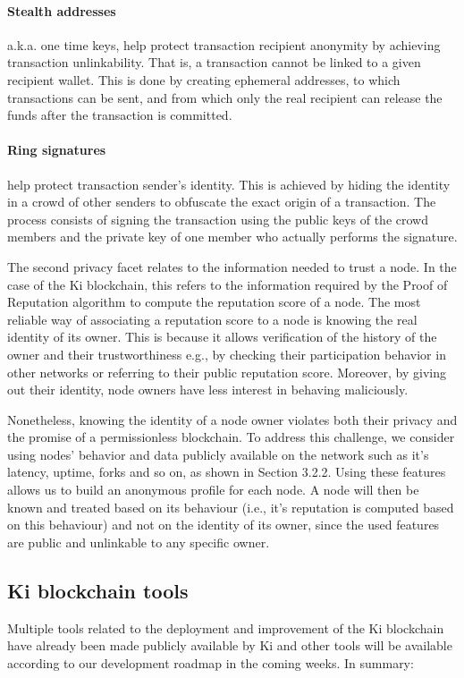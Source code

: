 \paragraph{Stealth addresses} a.k.a. one time keys, help protect transaction recipient anonymity by achieving transaction unlinkability. That is, a transaction cannot be linked to a given recipient wallet. This is done by creating ephemeral addresses, to which transactions can be sent, and from which only the real recipient can release the funds after the transaction is committed.

\paragraph{Ring signatures} help protect transaction sender's identity. This is achieved by hiding the identity in a crowd of other senders to obfuscate the exact origin of a transaction. The process consists of signing the transaction using the public keys of the crowd members and the private key of one member who actually performs the signature.  
					
The second privacy facet relates to the information needed to trust a node. In the case of the Ki blockchain, this refers to the information required by the Proof of Reputation algorithm to compute the reputation score of a node. The most reliable way of associating a reputation score to a node is knowing the real identity of its owner. This is because it allows verification of the history of the owner and their trustworthiness e.g., by checking their participation behavior in other networks or referring to their public reputation score. Moreover, by giving out their identity, node owners have less interest in behaving maliciously. 

Nonetheless, knowing the identity of a node owner violates both their privacy and the promise of a permissionless blockchain. To address this challenge, we consider using nodes' behavior and data publicly available on the network such as it's latency, uptime, forks and so on, as shown in Section 3.2.2. Using these features allows us to build an anonymous profile for each node. A node will then be known and treated based on its behaviour (i.e., it's reputation is computed based on this behaviour) and not on the identity of its owner, since the used features are public and unlinkable to any specific owner.    

\subsection{Ki blockchain tools}
\label{sec:kiblockchaintools}
Multiple tools related to the deployment and improvement of the Ki blockchain have already been made publicly available by Ki and other tools will be available according to our development roadmap in the coming weeks. In summary:
					
